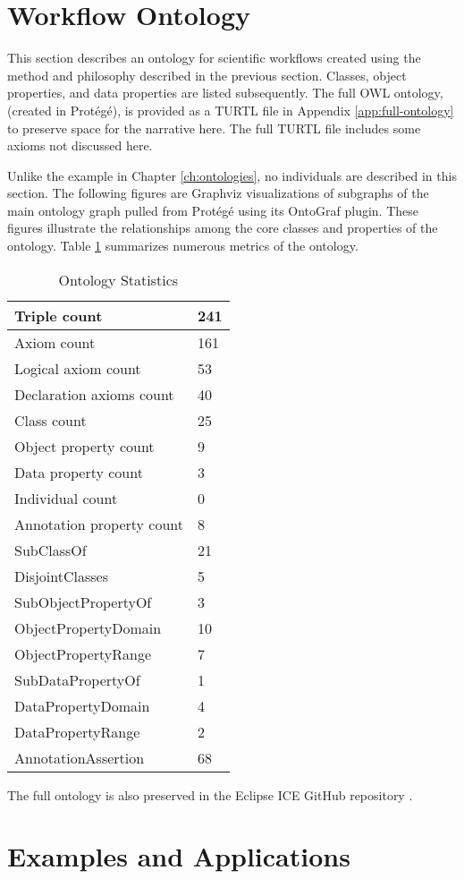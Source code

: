 \section{Workflow Ontology}
\label{workflow-ont-section}

This section describes an ontology for scientific workflows created using the
method and philosophy described in the previous section. Classes, object
properties, and data properties are listed subsequently. The full OWL ontology,
(created in Prot\'eg\'e), is provided as a TURTL file in Appendix
\ref{app:full-ontology} to preserve space for the narrative here. The full
TURTL file includes some axioms not discussed here. 

Unlike the example in Chapter \ref{ch:ontologies}, no individuals are described
in this section. The following figures are Graphviz visualizations
of subgraphs of the main ontology graph pulled from Prot\'eg\'e using its OntoGraf
plugin. These figures illustrate the relationships among the core classes and
properties of the ontology. Table \ref{ont-stats-table} summarizes numerous
metrics of the ontology.

\begin{table}[H]
\begin{tabularx}{\textwidth}{|X|X|}
\hline
Triple count & 241 \tabularnewline\hline
Axiom count	& 161	\tabularnewline\hline
Logical axiom count	& 53	\tabularnewline\hline
Declaration axioms count &	40	\tabularnewline\hline
Class count	& 25	\tabularnewline\hline
Object property count	& 9	\tabularnewline\hline
Data property count	& 3	\tabularnewline\hline
Individual count &	0	\tabularnewline\hline
Annotation property count	& 8 \tabularnewline\hline
SubClassOf	& 21		\tabularnewline\hline
DisjointClasses  &	5 \tabularnewline\hline
SubObjectPropertyOf	& 3 \tabularnewline\hline
ObjectPropertyDomain &	10	\tabularnewline\hline
ObjectPropertyRange	& 7 \tabularnewline\hline
SubDataPropertyOf	& 1 \tabularnewline\hline
DataPropertyDomain	& 4	\tabularnewline\hline
DataPropertyRange &	2 \tabularnewline\hline
AnnotationAssertion	& 68 \tabularnewline\hline
\end{tabularx}
\caption{Ontology Statistics}
\label{ont-stats-table}
\end{table}

The full ontology is also preserved in the Eclipse ICE GitHub repository
\cite{billings_ice_2019}.


\section{Examples and Applications}
\label{workflow-ont-examples}

